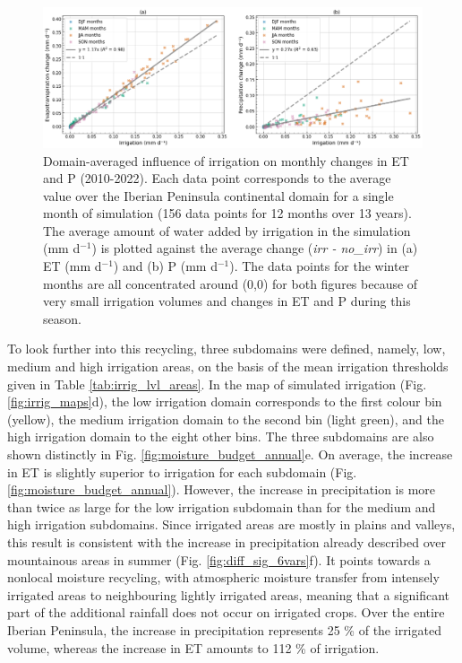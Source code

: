 \begin{figure}[htbp]
    \centering
    \includegraphics[width=\textwidth]{images/chap4/article/f08_colorblind.png}
    \caption{Domain-averaged influence of irrigation on monthly changes in ET and P (2010-2022). Each data point corresponds to the average value over the Iberian Peninsula continental domain for a single month of simulation (156 data points for 12 months over 13 years). The average amount of water added by irrigation in the \irr simulation (mm d$^{-1}$) is plotted against the average change (\textit{irr - no\_irr}) in (a) ET (mm d$^{-1}$) and (b) P (mm d$^{-1}$). The data points for the winter months are all concentrated around (0,0) for both figures because of very small irrigation volumes and changes in ET and P during this season.}
    \label{fig:scatter_IP}
\end{figure}

To look further into this recycling, three subdomains were defined, namely, low, medium and high irrigation areas, on the basis of the mean irrigation thresholds given in Table \ref{tab:irrig_lvl_areas}. In the map of simulated irrigation (Fig. \ref{fig:irrig_maps}d), the low irrigation domain corresponds to the first colour bin (yellow), the medium irrigation domain to the second bin (light green), and the high irrigation domain to the eight other bins. The three subdomains are also shown distinctly in Fig. \ref{fig:moisture_budget_annual}e.
On average, the increase in ET is slightly superior to irrigation for each subdomain (Fig. \ref{fig:moisture_budget_annual}).
However, the increase in precipitation is more than twice as large for the low irrigation subdomain than for the medium and high irrigation subdomains. Since irrigated areas are mostly in plains and valleys, this result is consistent with the increase in precipitation already described over mountainous areas in summer (Fig. \ref{fig:diff_sig_6vars}f). It points towards a nonlocal moisture recycling, with atmospheric moisture transfer from intensely irrigated areas to neighbouring lightly irrigated areas, meaning that a significant part of the additional rainfall does not occur on irrigated crops.
Over the entire Iberian Peninsula, the increase in precipitation represents 25 \% of the irrigated volume, whereas the increase in ET amounts to 112 \% of irrigation.

